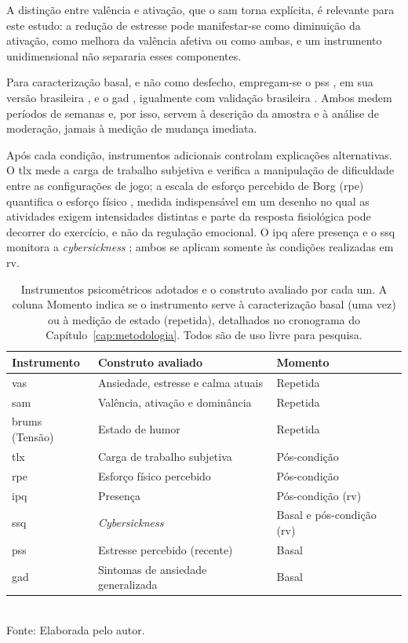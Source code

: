 A distinção entre valência e ativação, que o \gls{sam} torna explícita, é relevante para este estudo: a redução de estresse pode manifestar-se como diminuição da ativação, como melhora da valência afetiva ou como ambas, e um instrumento unidimensional não separaria esses componentes.

Para caracterização basal, e não como desfecho, empregam-se o \gls{pss} \citep{Cohen1983}, em sua versão brasileira \citep{Luft2007}, e o \gls{gad} \citep{Spitzer2006}, igualmente com validação brasileira \citep{Moreno2016}. Ambos medem períodos de semanas e, por isso, servem à descrição da amostra e à análise de moderação, jamais à medição de mudança imediata.

Após cada condição, instrumentos adicionais controlam explicações alternativas. O \gls{tlx} mede a carga de trabalho subjetiva \citep{HartStaveland1988} e verifica a manipulação de dificuldade entre as configurações de jogo; a escala de esforço percebido de Borg (\gls{rpe}) quantifica o esforço físico \citep{Borg1982}, medida indispensável em um desenho no qual as atividades exigem intensidades distintas e parte da resposta fisiológica pode decorrer do exercício, e não da regulação emocional. O \gls{ipq} afere presença \citep{Schubert2001} e o \gls{ssq} monitora a \textit{cybersickness} \citep{Kennedy1993,Goncalves2024}; ambos se aplicam somente às condições realizadas em \gls{rv}.

\begin{table}[htbp]
\centering
\caption{Instrumentos psicométricos adotados e o construto avaliado por cada um. A coluna Momento indica se o instrumento serve à caracterização basal (uma vez) ou à medição de estado (repetida), detalhados no cronograma do Capítulo~\ref{cap:metodologia}. Todos são de uso livre para pesquisa.}
\label{tab:instrumentos}
\small
\begin{tabularx}{\textwidth}{p{2.6cm}Xp{2.6cm}}
\toprule
\textbf{Instrumento} & \textbf{Construto avaliado} & \textbf{Momento} \\
\midrule
\gls{vas} & Ansiedade, estresse e calma atuais & Repetida \\
\gls{sam} & Valência, ativação e dominância & Repetida \\
\gls{brums} (Tensão) & Estado de humor & Repetida \\
\gls{tlx} & Carga de trabalho subjetiva & Pós-condição \\
\gls{rpe} & Esforço físico percebido & Pós-condição \\
\gls{ipq} & Presença & Pós-condição (\gls{rv}) \\
\gls{ssq} & \textit{Cybersickness} & Basal e pós-condição (\gls{rv}) \\
\gls{pss} & Estresse percebido (recente) & Basal \\
\gls{gad} & Sintomas de ansiedade generalizada & Basal \\
\bottomrule
\end{tabularx}\\[2pt]
{\footnotesize Fonte: Elaborada pelo autor.}
\end{table}

